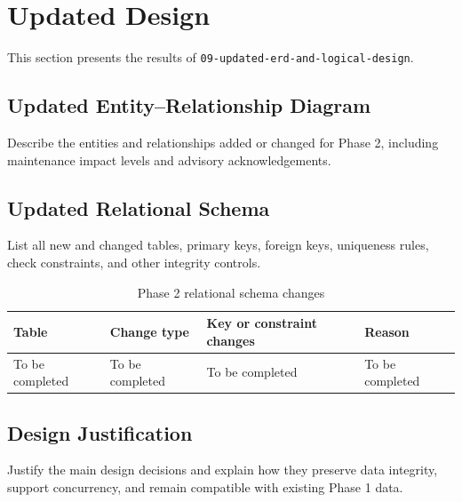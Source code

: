 \section{Updated Design}
\label{sec:updated-design}

This section presents the results of
\texttt{09-updated-erd-and-logical-design}.

\subsection{Updated Entity--Relationship Diagram}
Describe the entities and relationships added or changed for Phase 2,
including maintenance impact levels and advisory acknowledgements.

\subsection{Updated Relational Schema}
List all new and changed tables, primary keys, foreign keys, uniqueness rules,
check constraints, and other integrity controls.

\begin{table}[htbp]
    \centering
    \begin{tabularx}{\textwidth}{p{}p{}X X}
        \toprule
        \textbf{Table} & \textbf{Change type} & \textbf{Key or constraint changes} & \textbf{Reason} \\
        \midrule
        To be completed & To be completed & To be completed & To be completed \\
        \bottomrule
    \end{tabularx}
    \caption{Phase 2 relational schema changes}
    \label{tab:phase2-schema-changes}
\end{table}

\subsection{Design Justification}
Justify the main design decisions and explain how they preserve data integrity,
support concurrency, and remain compatible with existing Phase 1 data.